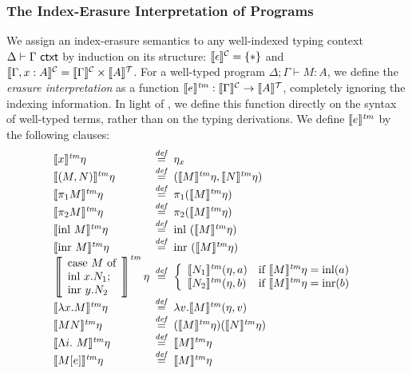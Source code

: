 \subsubsection{The Index-Erasure Interpretation of Programs}
\label{sec:erasure-semantics-programs}


We assign an index-erasure semantics to any well-indexed typing
context $\Delta \vdash \Gamma \textsf{ ctxt}$ by induction on its structure:
$\llbracket \epsilon \rrbracket^{\mathcal{C}} = \{*\}$ and $\llbracket \Gamma, x : A \rrbracket^{\mathcal{C}} =
\llbracket \Gamma \rrbracket^{\mathcal{C}} \times \llbracket A \rrbracket^{\mathcal{T}}$. For a well-typed program $\Delta;
\Gamma \vdash M : A$, we define the \emph{erasure interpretation} as a
function $\llbracket e \rrbracket^{\mathit{tm}} : \llbracket \Gamma \rrbracket^{\mathcal{C}} \to \llbracket A \rrbracket^{\mathcal{T}}$, completely
ignoring the indexing information. In light of
, we define this function directly on
the syntax of well-typed terms, rather than on the typing
derivations. We define $\llbracket e \rrbracket^{\mathit{tm}}$ by the following clauses:
\begin{displaymath}
  \begin{array}{@{\hspace{0em}}l@{\hspace{0.5em}}c@{\hspace{0.5em}}l}
    \tmSem{x}\eta & \isDefinedAs & \eta_x \\
    \tmSem{(M,N)}\eta & \isDefinedAs & (\tmSem{M}\eta, \tmSem{N}\eta) \\
    \tmSem{\pi_1M}\eta & \isDefinedAs & \pi_1(\tmSem{M}\eta) \\
    \tmSem{\pi_2M}\eta & \isDefinedAs & \pi_2(\tmSem{M}\eta) \\
    \tmSem{\mathrm{inl}\ M}\eta & \isDefinedAs & \mathrm{inl}\ (\tmSem{M}\eta) \\
    \tmSem{\mathrm{inr}\ M}\eta & \isDefinedAs & \mathrm{inr}\ (\tmSem{M}\eta) \\
    \left\llbracket
      \begin{array}{l}
        \textrm{case}\ M\ \textrm{of}\\
        \textrm{inl}\ x.N_1;\\
        \textrm{inr}\ y.N_2
      \end{array}\right\rrbracket^{\mathit{tm}}\eta & \isDefinedAs &
    \left\{
      \begin{array}{ll}
        \tmSem{N_1}(\eta,a) & \textrm{if }\tmSem{M}\eta = \mathrm{inl}(a) \\
        \tmSem{N_2}(\eta,b) & \textrm{if }\tmSem{M}\eta = \mathrm{inr}(b)
      \end{array}
    \right. \\
    \tmSem{\lambda x. M}\eta & \isDefinedAs & \lambda v. \tmSem{M}(\eta, v) \\
    \tmSem{M N}\eta & \isDefinedAs & (\tmSem{M}\eta) (\tmSem{N}\eta) \\
    \tmSem{\Lambda i.\ M}\eta & \isDefinedAs & \tmSem{M}\eta \\
    \tmSem{M[e]}\eta & \isDefinedAs & \tmSem{M}\eta    
  \end{array}
\end{displaymath}
